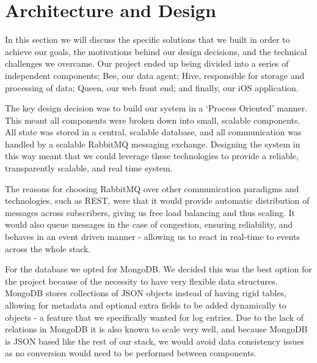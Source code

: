 \section{Architecture and Design}

In this section we will discuss the specific solutions that we built in order to
achieve our goals, the motivations behind our design decisions, and the
technical challenges we overcame. Our project ended up being divided into a
series of independent components; Bee, our data agent; Hive, responsible for
storage and processing of data; Queen, our web front end; and finally, our iOS
application.

The key design decision was to build our system in a ‘Process Oriented’ manner.
This meant all components were broken down into small, scalable components. All
state was stored in a central, scalable database, and all communication was
handled by a scalable RabbitMQ\cite{rabbit} messaging exchange. Designing the system in
this way meant that we could leverage these technologies to provide a reliable,
transparently scalable, and real time system.

The reasons for choosing RabbitMQ over other communication paradigms and
technologies, such as REST, were that it would provide automatic distribution of
messages across subscribers, giving us free load balancing and thus scaling. It
would also queue messages in the case of congestion, ensuring reliability, and
behaves in an event driven manner - allowing us to react in real-time to events
across the whole stack.

For the database we opted for MongoDB\cite{mongo}. We decided this was the best option
for the project because of the necessity to have very flexible data structures.
MongoDB stores collections of JSON objects instead of having rigid tables,
allowing for metadata and optional extra fields to be added dynamically to
objects - a feature that we specifically wanted for log entries. Due to the
lack of relations in MongoDB it is also known to scale very well, and because
MongoDB is JSON based like the rest of our stack, we would avoid data
consistency issues as no conversion would need to be performed between
components.

